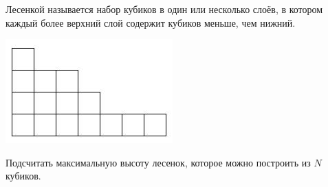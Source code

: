 Лесенкой называется набор кубиков в один или несколько слоёв, в котором
каждый более верхний слой содержит кубиков меньше, чем нижний.

\includegraphics[scale=1,natwidth=243, natheight=152]{lesenki_image_ru_1.jpg}

Подсчитать максимальную высоту лесенок, которое можно построить из $N$ кубиков.